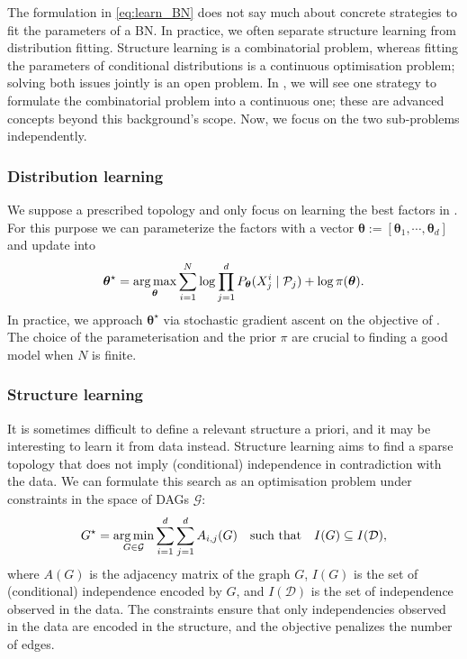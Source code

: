 The formulation in \ref{eq:learn_BN} does not say much about concrete strategies to fit the parameters of a BN. In practice, we often separate structure learning from distribution fitting. Structure learning is a combinatorial problem, whereas fitting the parameters of conditional distributions is a continuous optimisation problem; solving both issues jointly is an open problem. In , we will see one strategy to formulate the combinatorial problem into a continuous one; these are advanced concepts beyond this background's scope. Now, we focus on the two sub-problems independently.

\subsubsection{Distribution learning}
We suppose a prescribed topology and only focus on learning the best factors in . For this purpose we can parameterize the factors with a vector $\bm \theta := \left[\bm{\theta}_1, \cdots, \bm{\theta}_d\right]$ and update  into
\begin{align}
  {\bm \theta}^\star  = \operatorname*{arg\,max}_{\bm \theta} \sum_{i=1}^N \log \prod^d_{j=1}P_{\bm \theta}(X_j^i\mid \mathcal{P}_j) + \log \pi(\bm \theta).
 \label{eq:learn_factors}
\end{align}
In practice, we approach ${\bm \theta}^\star$ via stochastic gradient ascent on the objective of .
The choice of the parameterisation and the prior $\pi$ are crucial to finding a good model when $N$ is finite.

\subsubsection{Structure learning}
It is sometimes difficult to define a relevant structure a priori, and it may be interesting to learn it from data instead. Structure learning aims to find a sparse topology that does not imply (conditional) independence in contradiction with the data. We can formulate this search as an optimisation problem under constraints in the space of DAGs $\mathcal{G}$:
\begin{align}
 G^\star = \operatorname*{arg\,min}_{G \in \mathcal{G}} \sum_{i=1}^d\sum_{j=1}^d A_{i,j}(G) \quad \text{such that} \quad I(G) \subseteq I(\mathcal{D}), \label{eq:learn_structure}
\end{align}
where $A(G)$ is the adjacency matrix of the graph $G$, $I(G)$ is the set of (conditional) independence encoded by $G$, and $I(\mathcal{D})$ is the set of independence observed in the data. The constraints ensure that only independencies observed in the data are encoded in the structure, and the objective penalizes the number of edges.

